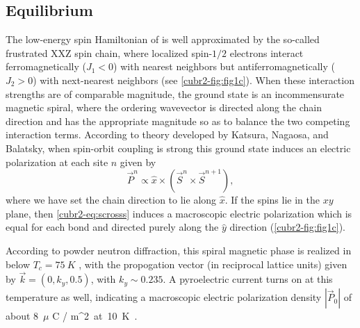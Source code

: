 \subsection{Equilibrium}
The low-energy spin Hamiltonian of  is well approximated by the so-called frustrated \oned XXZ spin chain, where localized spin-$1/2$ electrons interact ferromagnetically ($J_1 < 0$) with nearest neighbors but antiferromagnetically ($J_2 > 0$) with next-nearest neighbors (see \cref{cubr2-fig:fig1c}).
When these interaction strengths are of comparable magnitude, the ground state is an incommensurate magnetic spiral, where the ordering wavevector is directed along the chain direction and has the appropriate magnitude so as to balance the two competing interaction terms.
According to theory developed by Katsura, Nagaosa, and Balatsky\cite{katsura_spin_2005}, when spin-orbit coupling is strong this ground state induces an electric polarization at each site $n$ given by
\begin{equation}\label{cubr2-eq:scrosss}
\vec{P}^n \propto \hat{x}\times(\vec{S}^{n} \times \vec{S}^{n+1}),
\end{equation}
where we have set the chain direction to lie along $\hat{x}$.
If the spins lie in the $xy$ plane, then \cref{cubr2-eq:scrosss} induces a macroscopic electric polarization which is equal for each bond and directed purely along the $\hat{y}$ direction (\cref{cubr2-fig:fig1c}).

According to powder neutron diffraction, this spiral magnetic phase is realized in  below $T_c=\qty{75}{K}$ \cite{zhao_cubr2_2012,wang_nmr_2018,zhao_pressure_2019,
zhang_giant_2020}, with the propogation vector (in reciprocal lattice units) given by $\vec{k} = (0, k_y, 0.5)$, with $k_y\sim 0.235$\cite{zhao_cubr2_2012,lee_investigation_2012}.
A pyroelectric current turns on at this temperature as well, indicating a macroscopic electric polarization density $|\vec{P}_0|$ of about \qty{8}{$\mu$ C / m^2} at \qty{10}{K}\cite{zhao_cubr2_2012}.

